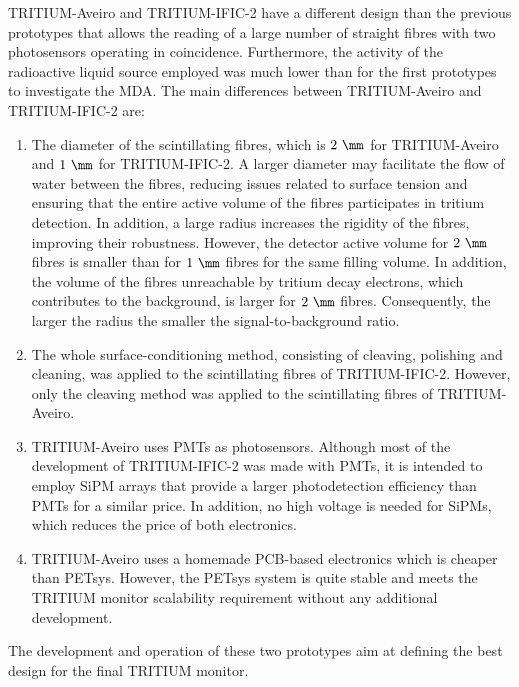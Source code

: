 TRITIUM-Aveiro and TRITIUM-IFIC-2 have a different design than the previous prototypes that allows the reading of a large number of straight fibres with two photosensors operating in coincidence. Furthermore, the activity of the radioactive liquid source employed was much lower than for the first prototypes to investigate the MDA. The main differences between TRITIUM-Aveiro and TRITIUM-IFIC-2 are:

\begin{enumerate}

\item{} The diameter of the scintillating fibres, which is $2~\mm$ for TRITIUM-Aveiro and $1~\mm$ for TRITIUM-IFIC-2. A larger diameter may facilitate the flow of water between the fibres, reducing issues related to surface tension and ensuring that the entire active volume of the fibres participates in tritium detection. In addition, a large radius increases the rigidity of the fibres, improving their robustness. However, the detector active volume for $2~\mm$ fibres is smaller than for $1~\mm$ fibres for the same filling volume. In addition, the volume of the fibres unreachable by tritium decay electrons, which contributes to the background, is larger for $2~\mm$ fibres. Consequently, the larger the radius the smaller the signal-to-background ratio.


\item{} The whole surface-conditioning method, consisting of cleaving, polishing and cleaning, was applied to the scintillating fibres of TRITIUM-IFIC-2. However, only the cleaving method was applied to the scintillating fibres of TRITIUM-Aveiro.

\item{} TRITIUM-Aveiro uses PMTs as photosensors. Although most of the development of TRITIUM-IFIC-2 was made with PMTs, it is intended to employ SiPM arrays that provide a larger photodetection efficiency than PMTs for a similar price. In addition, no high voltage is needed for SiPMs, which reduces the price of both electronics.

\item{} TRITIUM-Aveiro uses a homemade PCB-based electronics which is cheaper than PETsys. However, the PETsys system is quite stable and meets the TRITIUM monitor scalability requirement without any additional development.

\end{enumerate}

The development and operation of these two prototypes aim at defining the best design for the final TRITIUM monitor.
